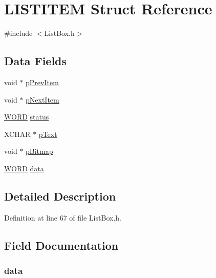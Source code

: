 \hypertarget{struct_l_i_s_t_i_t_e_m}{}\section{L\+I\+S\+T\+I\+T\+E\+M Struct Reference}
\label{struct_l_i_s_t_i_t_e_m}


{\ttfamily \#include $<$List\+Box.\+h$>$}

\subsection*{Data Fields}
\begin{DoxyCompactItemize}
\item 
void $\ast$ \hyperlink{struct_l_i_s_t_i_t_e_m_a7be6a1f7eb2ef84968680a3ea318e0ee}{p\+Prev\+Item}
\item 
void $\ast$ \hyperlink{struct_l_i_s_t_i_t_e_m_af5328877b08647c9f0ed84f22dca1616}{p\+Next\+Item}
\item 
\hyperlink{_generic_type_defs_8h_a2b0e863dadf920709ec53d9088ee7c91}{W\+O\+R\+D} \hyperlink{struct_l_i_s_t_i_t_e_m_ae9b729593cbf756556fd43454ade403f}{status}
\item 
X\+C\+H\+A\+R $\ast$ \hyperlink{struct_l_i_s_t_i_t_e_m_a934b5563cdaf14803728ff3a7b7e8c7f}{p\+Text}
\item 
void $\ast$ \hyperlink{struct_l_i_s_t_i_t_e_m_aef9bed8e1a29e17226ccbd9a3d81f9e1}{p\+Bitmap}
\item 
\hyperlink{_generic_type_defs_8h_a2b0e863dadf920709ec53d9088ee7c91}{W\+O\+R\+D} \hyperlink{struct_l_i_s_t_i_t_e_m_a295eccc6bcea267686ab024ef781baaf}{data}
\end{DoxyCompactItemize}


\subsection{Detailed Description}


Definition at line 67 of file List\+Box.\+h.



\subsection{Field Documentation}
\hypertarget{struct_l_i_s_t_i_t_e_m_a295eccc6bcea267686ab024ef781baaf}{}
\subsubsection[{data}]{ data}\label{struct_l_i_s_t_i_t_e_m_a295eccc6bcea267686ab024ef781baaf}



